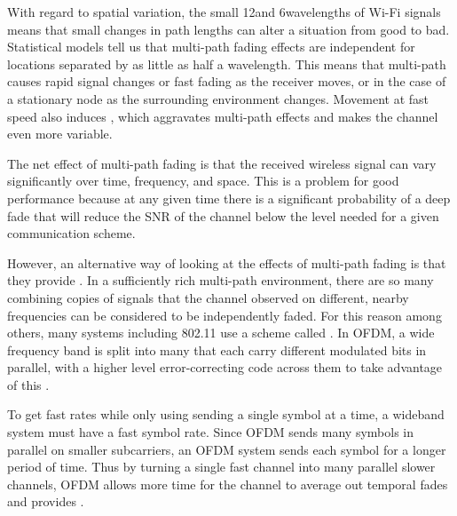 With regard to spatial variation, the small 12\cm and 6\cm wavelengths of Wi-Fi signals means that small changes in path lengths can alter a situation from good to bad. Statistical models tell us that multi-path fading effects are independent for locations separated by as little as half a wavelength. This means that multi-path causes rapid signal changes or fast fading as the receiver moves, or in the case of a stationary node as the surrounding environment changes.  Movement at fast speed also induces , which aggravates multi-path effects and makes the channel even more variable.

The net effect of multi-path fading is that the received wireless signal can vary significantly over time, frequency, and space. This is a problem for good performance because at any given time there is a significant probability of a deep fade that will reduce the SNR of the channel below the level needed for a given communication scheme.

However, an alternative way of looking at the effects of multi-path fading is that they provide . In a sufficiently rich multi-path environment, there are so many combining copies of signals that the channel observed on different, nearby frequencies can be considered to be independently faded. For this reason among others, many systems including 802.11 use a scheme called . In OFDM, a wide frequency band is split into many  that each carry different modulated bits in parallel, with a higher level error-correcting code across them to take advantage of this .

To get fast rates while only using sending a single symbol at a time, a wideband system must have a fast symbol rate. Since OFDM sends many symbols in parallel on smaller subcarriers, an OFDM system sends each symbol for a longer period of time. Thus by turning a single fast channel into many parallel slower channels, OFDM allows more time for the channel to average out temporal fades and provides .

